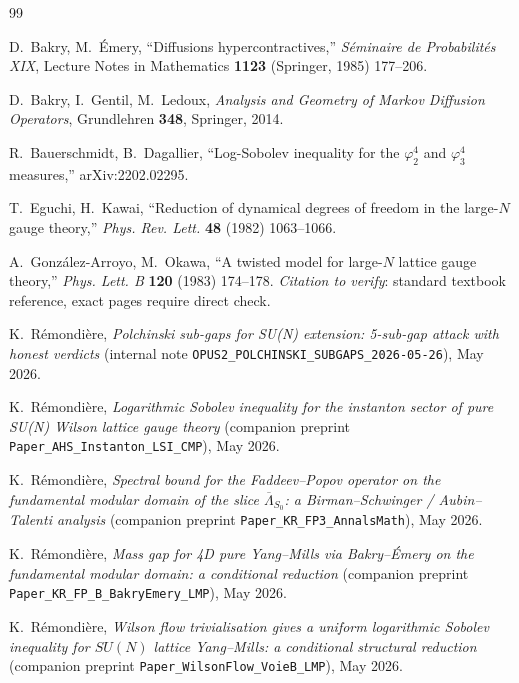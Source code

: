 \documentclass[11pt,a4paper]{amsart}
\theoremstyle{definition}
\begin{document}
\begin{thebibliography}{99}

D.~Bakry, M.~\'Emery,
``Diffusions hypercontractives,''
\emph{S\'eminaire de Probabilit\'es XIX},
Lecture Notes in Mathematics \textbf{1123} (Springer, 1985) 177--206.

D.~Bakry, I.~Gentil, M.~Ledoux,
\emph{Analysis and Geometry of Markov Diffusion Operators},
Grundlehren \textbf{348}, Springer, 2014.

R.~Bauerschmidt, B.~Dagallier,
``Log-Sobolev inequality for the $\varphi^4_2$ and $\varphi^4_3$ measures,''
arXiv:2202.02295.

T.~Eguchi, H.~Kawai,
``Reduction of dynamical degrees of freedom in the large-$N$ gauge theory,''
\emph{Phys. Rev. Lett.} \textbf{48} (1982) 1063--1066.

A.~Gonz\'alez-Arroyo, M.~Okawa,
``A twisted model for large-$N$ lattice gauge theory,''
\emph{Phys. Lett. B} \textbf{120} (1983) 174--178.
\emph{Citation to verify}: standard textbook reference, exact pages
require direct check.

K.~R\'emondi\`ere,
\emph{Polchinski sub-gaps for SU(N) extension: 5-sub-gap attack with
honest verdicts} (internal note
\texttt{OPUS2\_POLCHINSKI\_SUBGAPS\_2026-05-26}), May 2026.

K.~R\'emondi\`ere,
\emph{Logarithmic Sobolev inequality for the instanton sector of pure
SU(N) Wilson lattice gauge theory}
(companion preprint
\texttt{Paper\_AHS\_Instanton\_LSI\_CMP}), May 2026.

K.~R\'emondi\`ere,
\emph{Spectral bound for the Faddeev--Popov operator on the fundamental
modular domain of the slice $\overline\Lambda_{S_0}$: a Birman--Schwinger /
Aubin--Talenti analysis} (companion preprint
\texttt{Paper\_KR\_FP3\_AnnalsMath}), May 2026.

K.~R\'emondi\`ere,
\emph{Mass gap for 4D pure Yang--Mills via Bakry--\'Emery on the
fundamental modular domain: a conditional reduction} (companion preprint
\texttt{Paper\_KR\_FP\_B\_BakryEmery\_LMP}), May 2026.

K.~R\'emondi\`ere,
\emph{Wilson flow trivialisation gives a uniform logarithmic Sobolev
inequality for $SU(N)$ lattice Yang--Mills: a conditional structural
reduction} (companion preprint
\texttt{Paper\_WilsonFlow\_VoieB\_LMP}), May 2026.


\end{thebibliography}
\end{document}
